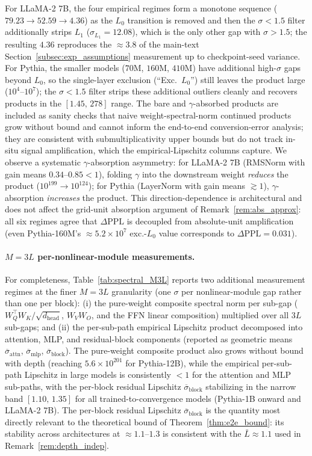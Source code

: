 \documentclass{article}
\theoremstyle{plain}
\theoremstyle{definition}
\theoremstyle{remark}
\begin{document}
For LLaMA-2 7B, the four empirical regimes form a monotone sequence
($79.23\to 52.59\to 4.36$) as the $L_0$ transition is removed and then the
$\sigma<1.5$ filter additionally strips $L_1$ ($\sigma_{L_1}=12.08$), which
is the only other gap with $\sigma>1.5$; the resulting $4.36$ reproduces
the $\approx 3.8$ of the main-text Section~\ref{subsec:exp_assumptions}
measurement up to checkpoint-seed variance. For Pythia, the smaller
models ($70$M, $160$M, $410$M) have additional high-$\sigma$ gaps beyond
$L_0$, so the single-layer exclusion (``Exc.\ $L_0$'') still leaves the
product large ($10^4$--$10^7$); the $\sigma<1.5$ filter strips these
additional outliers cleanly and recovers products in the $[1.45,\,278]$
range.
The bare and $\gamma$-absorbed products are included as sanity checks that
naive weight-spectral-norm continued products grow without bound and
cannot inform the end-to-end conversion-error analysis; they are consistent
with submultiplicativity upper bounds but do not track in-situ signal
amplification, which the empirical-Lipschitz columns capture.
We observe a systematic $\gamma$-absorption asymmetry: for LLaMA-2 7B
(RMSNorm with gain means $0.34$--$0.85<1$), folding $\gamma$ into the
downstream weight \emph{reduces} the product ($10^{199}\to 10^{124}$); for
Pythia (LayerNorm with gain means $\gtrsim 1$), $\gamma$-absorption
\emph{increases} the product. This direction-dependence is architectural
and does not affect the grid-unit absorption argument of
Remark~\ref{rem:abs_approx}: all six regimes agree that
$\Delta\mathrm{PPL}$ is decoupled from absolute-unit amplification (even
Pythia-160M's $\approx 5.2\times 10^{7}$ exc.-$L_0$ value corresponds to
$\Delta\mathrm{PPL}=0.031$).

\paragraph{$M=3L$ per-nonlinear-module measurements.}
For completeness, Table~\ref{tab:spectral_M3L} reports two additional
measurement regimes at the finer $M=3L$ granularity (one $\sigma$ per
nonlinear-module gap rather than one per block): (i) the pure-weight
composite spectral norm per sub-gap
($W_Q^\top W_K/\sqrt{d_{\text{head}}}$, $W_V W_O$, and the FFN linear
composition) multiplied over all $3L$ sub-gaps; and (ii) the per-sub-path
empirical Lipschitz product decomposed into attention, MLP, and
residual-block components (reported as geometric means
$\overline{\sigma}_{\text{attn}}$, $\overline{\sigma}_{\text{mlp}}$,
$\overline{\sigma}_{\text{block}}$). The pure-weight composite product
also grows without bound with depth (reaching $5.6\times 10^{201}$ for
Pythia-12B), while the empirical per-sub-path Lipschitz in large models
is consistently $<1$ for the attention and MLP sub-paths, with the
per-block residual Lipschitz
$\overline{\sigma}_{\text{block}}$ stabilizing in the narrow band
$[1.10,\,1.35]$ for all trained-to-convergence models
(Pythia-1B onward and LLaMA-2 7B). The per-block residual Lipschitz
$\overline{\sigma}_{\text{block}}$ is the quantity most directly relevant
to the theoretical bound of
Theorem~\ref{thm:e2e_bound}: its stability across architectures at
$\approx 1.1$--$1.3$ is consistent with the $\bar{L}\approx 1.1$ used in
Remark~\ref{rem:depth_indep}.
\end{document}

